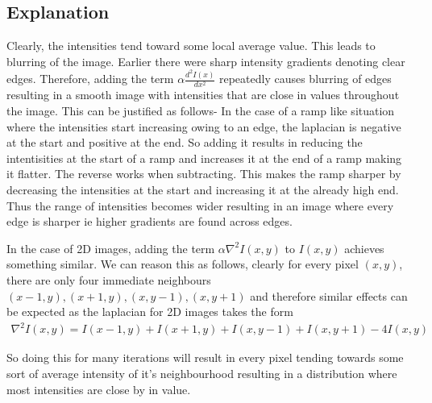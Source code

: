 \documentclass[12pt]{article}
\begin{document}
\begin{enumerate}
\begin{figure}[H]
        \end{figure}
    \end{enumerate}
    \subsection*{Explanation}
    Clearly, the intensities tend toward some local average value. This leads to blurring of the image.
    Earlier there were sharp intensity gradients denoting clear edges. Therefore, adding the term $\alpha \frac{d^{2}I(x)}{dx^{2}}$
    repeatedly causes blurring of edges resulting in a smooth image with intensities that are close in values throughout
    the image. This can be justified as follows- In the case of a ramp like situation where the intensities
    start increasing owing to an edge, the laplacian is negative at the start and positive at the end. So adding it 
    results in reducing the intentisities at the start of a ramp and increases it at the end of a ramp making it flatter. The 
    reverse works when subtracting. This makes the ramp sharper by decreasing the intensities at the start and increasing it
    at the already high end. Thus the range of intensities becomes wider resulting in an image where
    every edge is sharper ie higher gradients are found across edges. 

    In the case of 2D images, adding the term $\alpha \nabla^{2}I(x,y)$ to $I(x,y)$ achieves something similar. We can reason this
    as follows, clearly for every pixel $(x,y)$, there are only four immediate neighbours $(x - 1,y),(x + 1,y),(x,y - 1),(x,y + 1)$
    and therefore similar effects can be expected as the laplacian for 2D images takes the form
    \begin{align*}
        \nabla^{2} I(x,y) = I(x - 1,y) + I(x + 1,y) + I(x,y - 1) + I(x,y + 1) - 4I(x,y)
    \end{align*}

    So doing this for many iterations will result in every pixel tending towards some sort of average intensity of 
    it's neighbourhood resulting in a distribution where most intensities are close by in value.
\end{document}

